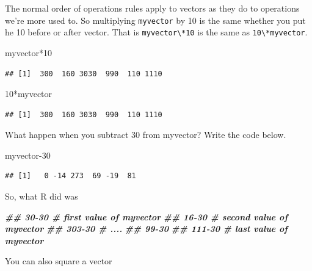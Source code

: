 \documentclass[
]{book}
\newenvironment{Shaded}{\begin{snugshade}}{\end{snugshade}}
\newcommand{\DecValTok}[1]{\textcolor[rgb]{0.00,0.00,0.81}{#1}}
\newcommand{\DocumentationTok}[1]{\textcolor[rgb]{0.56,0.35,0.01}{\textbf{\textit{#1}}}}
\newcommand{\NormalTok}[1]{#1}
\newcommand{\SpecialCharTok}[1]{\textcolor[rgb]{0.00,0.00,0.00}{#1}}
\begin{document}
The normal order of operations rules apply to vectors as they do to operations we're more used to. So multiplying \texttt{myvector} by 10 is the same whether you put he 10 before or after vector. That is \texttt{myvector\textbackslash{}*10} is the same as \texttt{10\textbackslash{}*myvector}.

\begin{Shaded}
\begin{Highlighting}[]
\NormalTok{myvector}\SpecialCharTok{*}\DecValTok{10}
\end{Highlighting}
\end{Shaded}

\begin{verbatim}
## [1]  300  160 3030  990  110 1110
\end{verbatim}

\begin{Shaded}
\begin{Highlighting}[]
\DecValTok{10}\SpecialCharTok{*}\NormalTok{myvector}
\end{Highlighting}
\end{Shaded}

\begin{verbatim}
## [1]  300  160 3030  990  110 1110
\end{verbatim}

What happen when you subtract 30 from myvector? Write the code below.

\begin{Shaded}
\begin{Highlighting}[]
\NormalTok{myvector}\DecValTok{{-}30}
\end{Highlighting}
\end{Shaded}

\begin{verbatim}
## [1]   0 -14 273  69 -19  81
\end{verbatim}

So, what R did was

\begin{Shaded}
\begin{Highlighting}[]
\DocumentationTok{\#\# 30{-}30    \# first value of myvector}
\DocumentationTok{\#\# 16{-}30    \# second value of myvector}
\DocumentationTok{\#\# 303{-}30   \# ....}
\DocumentationTok{\#\# 99{-}30}
\DocumentationTok{\#\# 111{-}30   \# last value of myvector}
\end{Highlighting}
\end{Shaded}

You can also square a vector
\end{document}
